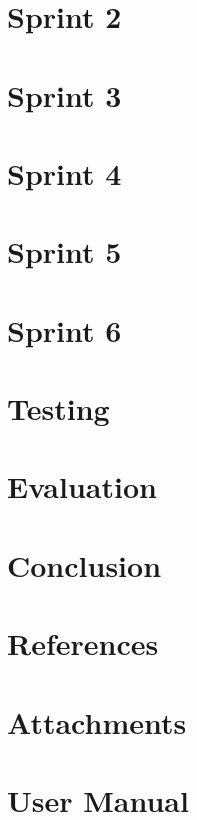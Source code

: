 \documentclass{report}
\begin{document}
\chapter{Sprint 2}


\chapter{Sprint 3}


\chapter{Sprint 4}


\chapter{Sprint 5}


\chapter{Sprint 6}


\chapter{Testing}


\chapter{Evaluation}


\chapter{Conclusion}


\chapter{References}


\chapter{Attachments}


\appendix
\chapter{User Manual}
\end{document}
